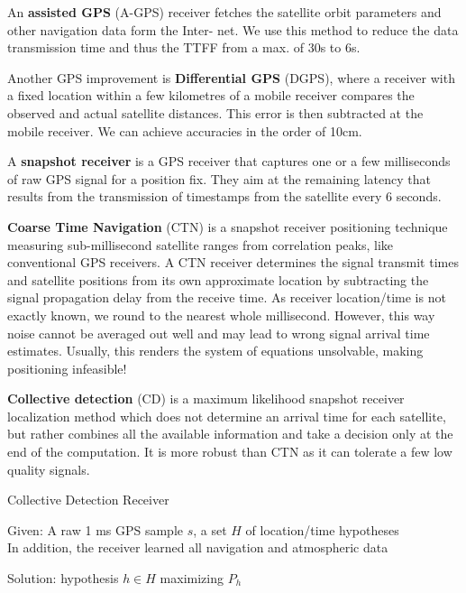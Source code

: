 An \textbf{assisted GPS} (A-GPS) receiver fetches the satellite orbit parameters and other navigation data form the Inter- net. We use this method to reduce the data transmission time and thus the TTFF from a max. of 30s to 6s. \medskip

Another GPS improvement is \textbf{Differential GPS} (DGPS), where a receiver with a fixed location within a few kilometres of a mobile receiver compares the observed and actual satellite distances. This error is then subtracted at the mobile receiver. We can achieve accuracies in the order of 10cm. \medskip

A \textbf{snapshot receiver} is a GPS receiver that captures one or a few milliseconds of raw GPS signal for a position fix. They aim at the remaining latency that results from the transmission of timestamps from the satellite every 6 seconds. \medskip

\textbf{Coarse Time Navigation} (CTN) is a snapshot receiver positioning technique measuring sub-millisecond satellite ranges from correlation peaks, like conventional GPS receivers. A CTN receiver determines the signal transmit times and satellite positions from its own approximate location by subtracting the signal propagation delay from the receive time. As receiver location/time is not exactly known, we round to the nearest whole millisecond. However, this way noise cannot be averaged out well and may lead to wrong signal arrival time estimates. Usually, this renders the system of equations unsolvable, making positioning infeasible!\medskip

\textbf{Collective detection} (CD) is a maximum likelihood snapshot receiver localization method which does not determine an arrival time for each satellite, but rather combines all the available information and take a decision only at the end of the computation. It is more robust than CTN as it can tolerate a few low quality signals.\medskip

\begin{algorithm}[H]
\caption{Collective Detection Receiver}
	Given: A raw 1 ms GPS sample $s$, a set $H$ of location/time hypotheses \\
	In addition, the receiver learned all navigation and atmospheric data
	
	\BlankLine
	
	Solution: hypothesis $h \in H$ maximizing $P_h$
\end{algorithm}


